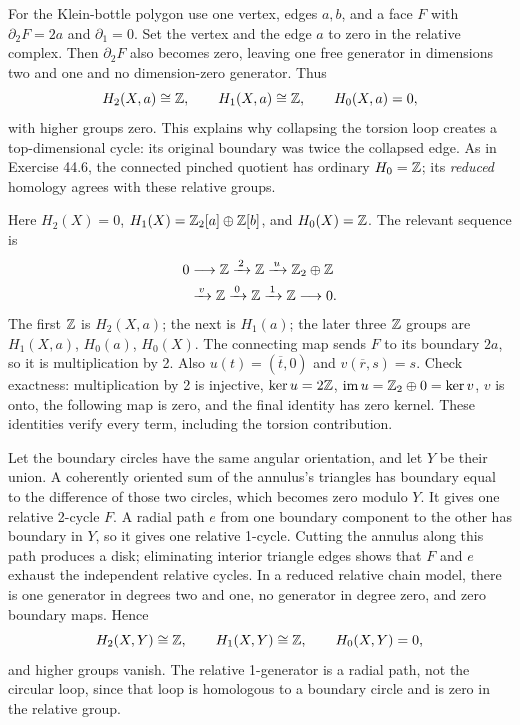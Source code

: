 For the Klein-bottle polygon use one vertex, edges $a,b$, and a face $F$ with $\partial_2F=2a$ and $\partial_1=0$. Set the vertex and the edge $a$ to zero in the relative complex. Then $\partial_2F$ also becomes zero, leaving one free generator in dimensions two and one and no dimension-zero generator.
Thus
\[
H_2(X,a)\cong\mathbb{Z},\qquad H_1(X,a)\cong\mathbb{Z},
\qquad H_0(X,a)=0,
\]
with higher groups zero.
This explains why collapsing the torsion loop creates a top-dimensional cycle: its original boundary was twice the collapsed edge. As in Exercise 44.6, the connected pinched quotient has ordinary $H_0=\mathbb{Z}$; its \emph{reduced} homology agrees with these relative groups.

Here $H_2(X)=0$, $H_1(X)=\mathbb{Z}_2[a]\oplus\mathbb{Z}[b]$, and $H_0(X)=\mathbb{Z}$.
The relevant sequence is
\[
\begin{aligned}
0&\longrightarrow\mathbb{Z}\xrightarrow{\,2\,}\mathbb{Z}
\xrightarrow{\,u\,}\mathbb{Z}_2\oplus\mathbb{Z}\\
&\xrightarrow{\,v\,}\mathbb{Z}\xrightarrow{\,0\,}\mathbb{Z}
\xrightarrow{\,1\,}\mathbb{Z}\longrightarrow0.
\end{aligned}
\]
The first $\mathbb{Z}$ is $H_2(X,a)$; the next is $H_1(a)$; the later three $\mathbb{Z}$ groups are $H_1(X,a)$, $H_0(a)$, $H_0(X)$.
The connecting map sends $F$ to its boundary $2a$, so it is multiplication by 2. Also $u(t)=(\overline t,0)$ and $v(\overline r,s)=s$.
Check exactness: multiplication by 2 is injective, $\ker u=2\mathbb{Z}$, $\operatorname{im}u=\mathbb{Z}_2\oplus0=\ker v$, $v$ is onto, the following map is zero, and the final identity has zero kernel. These identities verify every term, including the torsion contribution.

Let the boundary circles have the same angular orientation, and let $Y$ be their union. A coherently oriented sum of the annulus's triangles has boundary equal to the difference of those two circles, which becomes zero modulo $Y$. It gives one relative 2-cycle $F$.
A radial path $e$ from one boundary component to the other has boundary in $Y$, so it gives one relative 1-cycle. Cutting the annulus along this path produces a disk; eliminating interior triangle edges shows that $F$ and $e$ exhaust the independent relative cycles. In a reduced relative chain model, there is one generator in degrees two and one, no generator in degree zero, and zero boundary maps.
Hence
\[
H_2(X,Y)\cong\mathbb{Z},\qquad H_1(X,Y)\cong\mathbb{Z},
\qquad H_0(X,Y)=0,
\]
and higher groups vanish. The relative 1-generator is a radial path, not the circular loop, since that loop is homologous to a boundary circle and is zero in the relative group.

